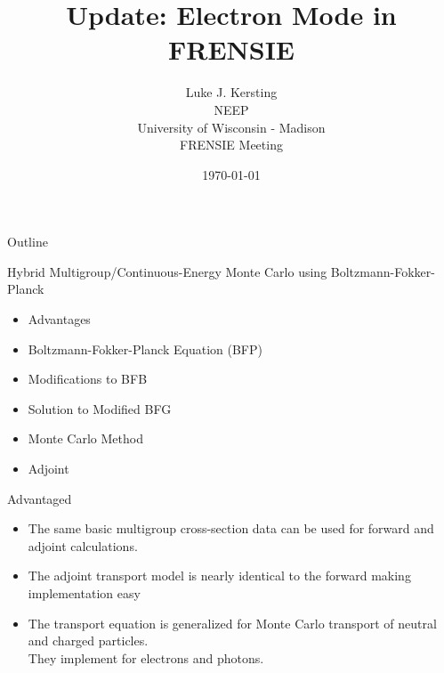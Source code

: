 \documentclass{beamer}
\author{Luke J. Kersting
    \\ NEEP
    \\ University of Wisconsin - Madison
    \\ FRENSIE Meeting
}
\date{\today}
\title{Update: Electron Mode in FRENSIE}
\begin{document}
\maketitle

\begin{frame}{Outline}

  \begin{block}{Hybrid Multigroup/Continuous-Energy Monte Carlo using Boltzmann-Fokker-Planck}
    \begin{itemize}
      \item Advantages
      \item Boltzmann-Fokker-Planck Equation (BFP)
      \item Modifications to BFB
      \item Solution to Modified BFG
      \item Monte Carlo Method
      \item Adjoint
    \end{itemize}
  \end{block}
    

\end{frame}


\begin{frame}{Advantaged}
 
    \begin{itemize}
      \item The same basic multigroup cross-section data can be used for forward and adjoint calculations. 
       
      \item The adjoint transport model is nearly identical to the forward making implementation easy 

      \item The transport equation is generalized for Monte Carlo transport of neutral and charged particles.\\ They implement for electrons and photons. 

    \end{itemize}

\end{frame}
\end{document}
